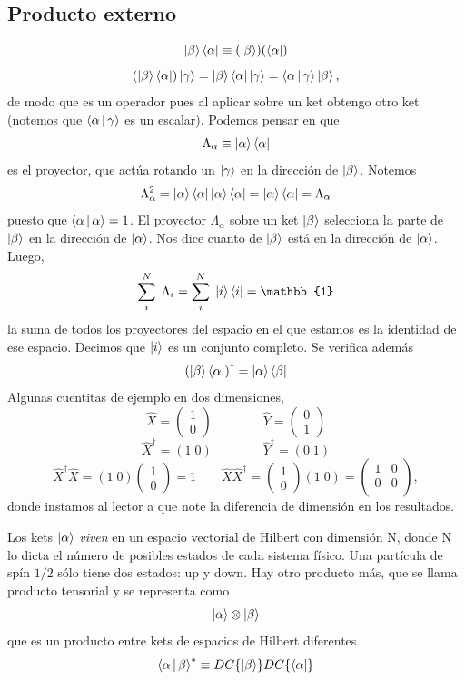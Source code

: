 \documentclass[10pt,oneside]{CBFT_book}
\begin{document}
\subsection{Producto externo}

\[
	\Ket{\beta} \Bra{\alpha} \equiv (\Ket{\beta} )( \Bra{\alpha} )
\]
\[
	( \Ket{\beta} \Bra{\alpha} )\Ket{\gamma} = \Ket{\beta} \Bra{\alpha} \Ket{\gamma} =
		\Braket{\alpha|\gamma} \Ket{\beta} , 
\]
de modo que es un operador pues al aplicar sobre un ket obtengo otro ket (notemos que $\Braket{\alpha|\gamma}$
es un escalar). Podemos pensar en que 
\[
	\Lambda_\alpha \equiv \Ket{\alpha}\Bra{\alpha}
\]
es el proyector, que actúa rotando un $\Ket{\gamma}$ en la dirección de $\Ket{\beta}$. Notemos 
\[
	\Lambda_\alpha^2 = \Ket{\alpha}\Bra{\alpha}\Ket{\alpha}\Bra{\alpha} = \Ket{\alpha}\Bra{\alpha} = \Lambda_\alpha
\]
puesto que $\Braket{\alpha|\alpha}=1$. El proyector $\Lambda_\alpha$ sobre un ket $\Ket{\beta}$ selecciona la parte de
$\Ket{\beta}$ en la dirección de $\Ket{\alpha}$. Nos dice cuanto de $\Ket{\beta}$ está en la dirección de 
$\Ket{\alpha}$.
Luego,
\[
	\sum_i^N \; \Lambda_i = \sum_i^N \; \Ket{i}\Bra{i} = \mathbb{1}
\]
la suma de todos los proyectores del espacio en el que estamos es la identidad de ese espacio. Decimos que $\Ket{i}$ es 
un conjunto completo. Se verifica además
\[
	(\Ket{\beta} \Bra{\alpha})^\dagger = \Ket{\alpha} \Bra{\beta}
\]
Algunas cuentitas de ejemplo en dos dimensiones,
\[
	\hat{X} = \begin{pmatrix} 1 \\ 0 \end{pmatrix} \qquad \qquad \hat{Y} = \begin{pmatrix} 0 \\ 1 \end{pmatrix}
\]
\[
	\hat{X}^\dagger = ( 1 \; 0 ) \qquad \qquad \hat{Y}^\dagger = ( 0 \; 1  ) 
\]
\[
	\hat{X}^\dagger\hat{X} = (1 \; 0) \begin{pmatrix} 1 \\ 0 \end{pmatrix} = 1 \qquad 
	\hat{X}\hat{X}^\dagger = \begin{pmatrix} 1 \\ 0 \end{pmatrix} (1 \; 0) = 
	\begin{pmatrix} 1 & 0 \\ 0 & 0 \\ \end{pmatrix},
\]
donde instamos al lector a que note la diferencia de dimensión en los resultados.

Los kets $\Ket{\alpha}$ {\it viven} en un espacio vectorial de Hilbert con dimensión N, donde N lo dicta el número de 
posibles estados de cada sistema físico. Una partícula de spín $1/2$ sólo tiene dos estados: up y down.
Hay otro producto más, que se llama producto tensorial y se representa como 
\[
	\Ket{\alpha} \otimes \Ket{\beta}
\]
que es un producto entre kets de espacios de Hilbert diferentes.
\[
	\Braket{\alpha|\beta}^* \equiv DC\{\ket{\beta}\} DC\{\Bra{\alpha}\}
\]




\end{document}
